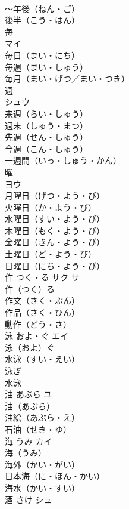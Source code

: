 \documentclass[8pt]{extreport}
\begin{document}
\begin{CJK}{UTF8}{min}
\\	～年後（ねん・ご）　
\\	後半（こう・はん）　
\\	毎	
\\	マイ	
\\	毎日（まい・にち）　
\\	毎週（まい・しゅう）　
\\	毎月（まい・げつ／まい・つき）　
\\	週	
\\	シュウ	
\\	来週（らい・しゅう）　
\\	週末（しゅう・まつ）　
\\	先週（せん・しゅう）　
\\	今週（こん・しゅう）　
\\	一週間（いっ・しゅう・かん）　
\\	曜	
\\	ヨウ	
\\	月曜日（げつ・よう・び）　
\\	火曜日（か・よう・び）　
\\	水曜日（すい・よう・び）　
\\	木曜日（もく・よう・び）　
\\	金曜日（きん・よう・び）　
\\	土曜日（ど・よう・び）　
\\	日曜日（にち・よう・び）　
\\	作	つく・る	サク サ	
\\	作（つく）る　
\\	作文（さく・ぶん）　
\\	作品（さく・ひん）　
\\	動作（どう・さ）　
\\	泳	およ・ぐ	エイ	
\\	泳（およ）ぐ　
\\	水泳（すい・えい）　
\\	泳ぎ 
\\	水泳 
\\	油	あぶら	ユ	
\\	油（あぶら）　
\\	油絵（あぶら・え）　
\\	石油（せき・ゆ）　
\\	海	うみ	カイ	
\\	海（うみ）　
\\	海外（かい・がい）　
\\	日本海（に・ほん・かい）　
\\	海水（かい・すい）　
\\	酒	さけ	シュ	

\end{CJK}
\end{document}
